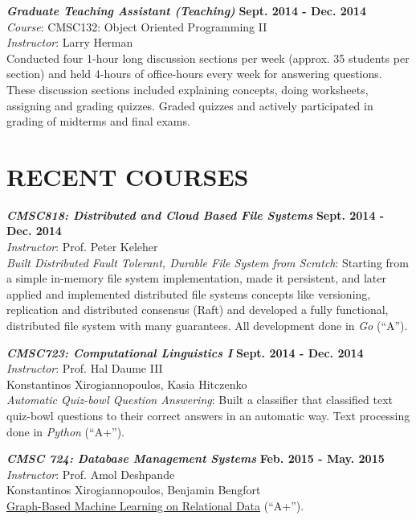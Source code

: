 \documentclass[margin, 10pt]{res} %
\begin{document}
\begin{resume}
{\sl \textbf{Graduate Teaching Assistant (Teaching)}} \hfill \textbf{Sept. 2014 - Dec. 2014}\\
\textit{Course}: CMSC132: Object Oriented Programming II \\
\textit{Instructor}: Larry Herman\\
Conducted four 1-hour long discussion sections per week (approx. 35 students per section) and held 4-hours of office-hours every week for answering questions. These discussion sections included explaining concepts, doing worksheets, assigning and grading quizzes. Graded quizzes and actively participated in grading of midterms and final exams.


\section{RECENT COURSES}

{\sl \textbf{CMSC818: Distributed and Cloud Based File Systems}} \hfill \textbf{Sept. 2014 - Dec. 2014}\\
\textit{Instructor}: Prof. Peter Keleher\\
\textit{Built Distributed Fault Tolerant, Durable File System from Scratch}: Starting from a simple in-memory file system implementation, made it persistent, and later applied and implemented distributed file systems concepts like versioning, replication and distributed consensus (Raft) and developed a fully functional, distributed file system with many guarantees. All development done in \textit{Go} (``A'').

{\sl \textbf{CMSC723: Computational Linguistics I}} \hfill \textbf{Sept. 2014 - Dec. 2014}\\
\textit{Instructor}: Prof. Hal Daume III\\
Konstantinos Xirogiannopoulos, Kasia Hitczenko\\
\textit{Automatic Quiz-bowl Question Answering}: Built a classifier that classified text quiz-bowl questions to their correct answers in an automatic way. Text processing done in \textit{Python} (``A+'').

{\sl \textbf{CMSC 724: Database Management Systems}} \hfill \textbf{Feb. 2015 - May. 2015}\\
\textit{Instructor}: Prof. Amol Deshpande\\
Konstantinos Xirogiannopoulos, Benjamin Bengfort\\
\href{https://drive.google.com/open?id=0B20MIwp_I7FlUGhyVmFYcjFuYmM}{Graph-Based Machine Learning on Relational Data} (``A+'').


\end{resume}
\end{document}
